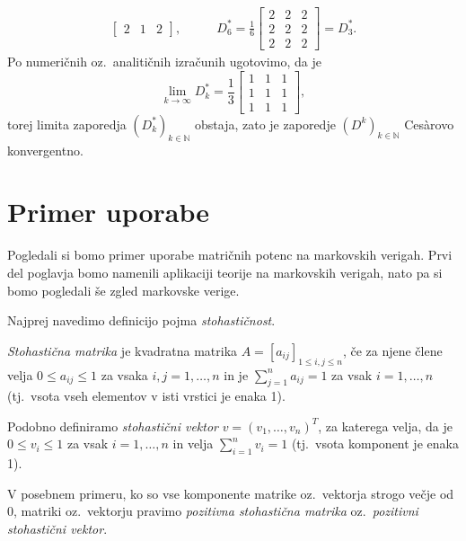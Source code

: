 \documentclass[mat1]{fmfdelo}
\newcommand{\N}{\mathbb N}
\begin{document}
\begin{zgled}
\begin{align*}
\begin{bmatrix}
            2 & 1 & 2
        \end{bmatrix},\quad\quad
        &D_6^\ast = \frac{1}{6}
        \begin{bmatrix}
            2 & 2 & 2 \\
            2 & 2 & 2 \\
            2 & 2 & 2
        \end{bmatrix} = D_3^\ast.
    \end{align*}
    Po numeričnih oz.\ analitičnih izračunih ugotovimo, da je
    \begin{equation*}
        \lim_{k\rightarrow\infty} D_k^\ast =
        \frac{1}{3}
        \begin{bmatrix}
            1 & 1 & 1 \\
            1 & 1 & 1 \\
            1 & 1 & 1
        \end{bmatrix},
    \end{equation*}
    torej limita zaporedja $(D_k^\ast)_{k\in\N}$ obstaja, zato je zaporedje $(D^k)_{k\in\N}$ Ces\`arovo konvergentno.
\end{zgled}

\section{Primer uporabe}
Pogledali si bomo primer uporabe matričnih potenc na markovskih verigah. Prvi del poglavja bomo namenili aplikaciji teorije na markovskih verigah, nato pa si bomo pogledali še zgled markovske verige.

Najprej navedimo definicijo pojma \emph{stohastičnost}.
\begin{definicija}
    \emph{Stohastična matrika} je kvadratna matrika $A = [a_{ij}]_{1 \leq i,j \leq n}$, če za njene člene velja $0 \leq a_{ij} \leq 1$ za vsaka $i,j = 1,\ldots, n$ in je $\sum_{j=1}^n a_{ij} = 1$ za vsak $i = 1,\dots,n$ (tj.\ vsota vseh elementov v isti vrstici je enaka 1).

    Podobno definiramo \emph{stohastični vektor} $v = (v_1, \dots, v_n)^T$, za katerega velja, da je $0 \leq v_i \leq 1$ za vsak $i = 1,\ldots, n$ in velja $\sum_{i=1}^n v_i = 1$ (tj.\ vsota komponent je enaka 1).

    V posebnem primeru, ko so vse komponente matrike oz.\ vektorja strogo večje od 0, matriki oz.\ vektorju pravimo \emph{pozitivna stohastična matrika} oz.\ \emph{pozitivni stohastični vektor}.
\end{definicija}
\end{document}
